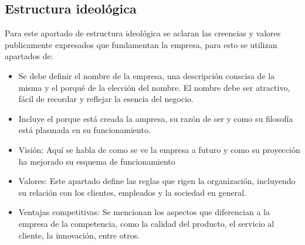 
\subsection{Estructura ideológica}

Para este apartado de estructura ideológica se aclaran las creencias y valores publicamente expresados que fundamentan la empresa, para esto se utilizan apartados de:

\begin{itemize}
    \item Se debe definir el nombre de la empresa, una descripción conscisa de la misma y el porqué de la elección del nombre. El nombre debe ser atractivo, fácil de recordar y reflejar la esencia del negocio. 
    
    \item Incluye el porque está creada la ampresa, su razón de ser y como su filosofía está plasmada en su funcionamiento.
    \item Visión: Aquí se habla de como se ve la empresa a futuro y como su proyección ha mejorado su esquema de funcionamiento
    \item Valores: Este apartado define las reglas que rigen la organización, incluyendo su relación con los clientes, empleados y la sociedad en general.
    \item Ventajas competitivas: Se mencionan los aspectos que diferencian a la empresa de la competencia, como la calidad del producto, el servicio al cliente, la innovación, entre otros.
    
\end{itemize}

